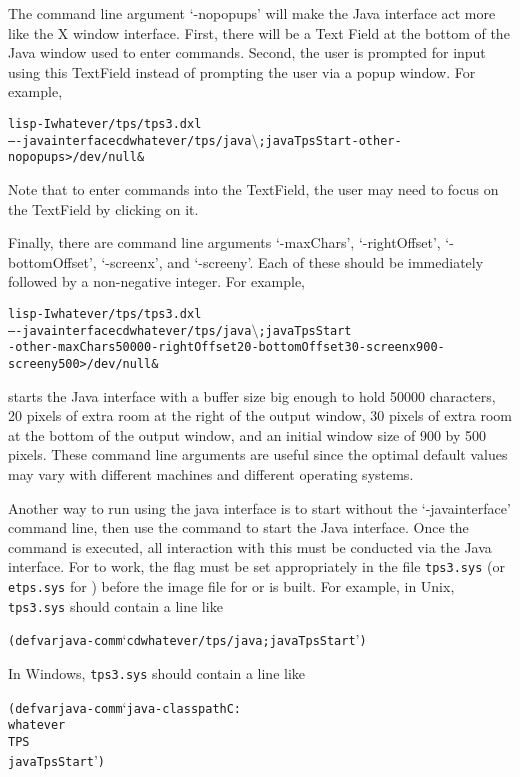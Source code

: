 The command line argument `-nopopups' will make the Java interface
act more like the X window interface.  First, there will be a Text Field
at the bottom of the Java window used to enter commands.  Second, the
user is prompted for input using this TextField instead of prompting
the user via a popup window.  For example,
\begin{alltt}
lisp -I whatever/tps/tps3.dxl
     -- -javainterface cd whatever/tps/java \(\setminus\); java TpsStart -other -nopopups > /dev/null \&
\end{alltt}
Note that to enter commands into the TextField, the user may need
to focus on the TextField by clicking on it.

Finally, there are command line arguments `-maxChars', `-rightOffset',
`-bottomOffset', `-screenx', and `-screeny'.  Each of these should be
immediately followed by a non-negative integer.  For example,
\begin{alltt}
lisp -I whatever/tps/tps3.dxl
     -- -javainterface cd whatever/tps/java \(\setminus\); java TpsStart
     -other -maxChars 50000 -rightOffset 20 -bottomOffset 30 -screenx 900 -screeny 500 > /dev/null \&
\end{alltt}
starts the Java interface with a buffer size big enough to hold 50000 characters,
20 pixels of extra room at the right of the output window, 30 pixels of extra
room at the bottom of the output window, and an initial window size of 900 by 500 pixels.
These command line arguments are useful since the optimal default values may vary with
different machines and different operating systems.

Another way to run {\TPS} using the java interface is to start
{\TPS} without the `-javainterface' command line, then
use the {\TPS} command  to start the Java interface.
Once the command  is executed, all interaction
with this {\TPS} must be conducted via the Java interface.
For  to work, the flag 
must be set appropriately in the file {\tt tps3.sys} (or {\tt etps.sys}
for {\ETPS}) before the image file for {\TPS}{or {\ETPS}} is built.
For example, in Unix, {\tt tps3.sys} should contain a line like
\begin{alltt}
(defvar java-comm `cd whatever/tps/java ; java TpsStart')
\end{alltt}
In Windows, {\tt tps3.sys} should contain a line like
\begin{alltt}
(defvar java-comm `java -classpath C:\\whatever\\TPS\\java TpsStart')
\end{alltt}

